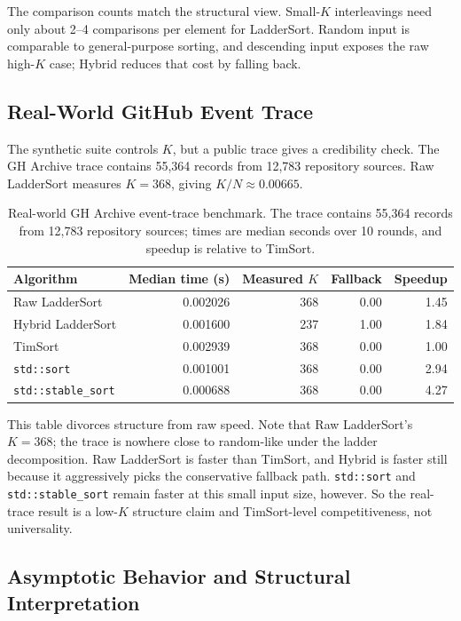 \documentclass[10pt]{article}
\begin{document}
The comparison counts match the structural view. Small-\(K\) interleavings need only about 2--4 comparisons per element for LadderSort. Random input is comparable to general-purpose sorting, and descending input exposes the raw high-\(K\) case; Hybrid reduces that cost by falling back.

\subsection{Real-World GitHub Event Trace}
\label{real-world-github-event-trace}

The synthetic suite controls \(K\), but a public trace gives a credibility check. The GH Archive trace contains 55,364 records from 12,783 repository sources. Raw LadderSort measures \(K=368\), giving \(K/N\approx 0.00665\).

\begin{table}[H]
\centering
\scriptsize
\caption{Real-world GH Archive event-trace benchmark. The trace contains 55,364 records from 12,783 repository sources; times are median seconds over 10 rounds, and speedup is relative to TimSort.}
\label{tab:phase6-real-trace}
\begin{tabular}{@{}lrrrr@{}}
\toprule
Algorithm & Median time (s) & Measured \(K\) & Fallback & Speedup \\
\midrule
Raw LadderSort & 0.002026 & 368 & 0.00 & 1.45 \\
Hybrid LadderSort & 0.001600 & 237 & 1.00 & 1.84 \\
TimSort & 0.002939 & 368 & 0.00 & 1.00 \\
\texttt{std::sort} & 0.001001 & 368 & 0.00 & 2.94 \\
\texttt{std::stable\_sort} & 0.000688 & 368 & 0.00 & 4.27 \\
\bottomrule
\end{tabular}
\end{table}

This table divorces structure from raw speed. Note that Raw LadderSort's
\(K=368\); the trace is nowhere close to random-like under the ladder
decomposition. Raw LadderSort is faster than TimSort, and Hybrid is faster still
because it aggressively picks the conservative fallback path. \texttt{std::sort}
and \texttt{std::stable\_sort} remain faster at this small input size, however.
So the real-trace result is a low-\(K\) structure claim and TimSort-level
competitiveness, not universality.

\subsection{\texorpdfstring{\textbf{Asymptotic Behavior and Structural Interpretation}}{Asymptotic Behavior and Structural Interpretation}}\label{asymptotic-behavior-and-structural-interpretation}
\end{document}
